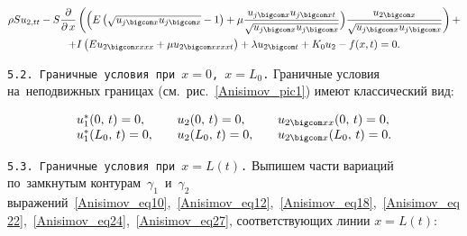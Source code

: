 \begin{multline}\label{Anisimov_eq30}

\rho Su_{2,tt}-S\frac{\partial}{\partial\,x}\left(\Bigl(E\left(\sqrt{u_{j \bigcom x}u_{j \bigcom x}}-1\right)+ \mu\frac{u_{j \bigcom x}u_{j \bigcom xt}}{\sqrt{u_{j \bigcom x}u_{j \bigcom x}}}\Bigr) \frac{u_{2 \bigcom x}}{\sqrt{u_{j \bigcom x}u_{j \bigcom x}}}\right)+\\

+I\left(Eu_{2 \bigcom xxxx}+\mu u_{2 \bigcom xxxxt}\right)+\lambda u_{2 \bigcom t}+K_0u_2-f( x,  t )=0.

\end{multline}



\smallskip



{\tt 5.2. Граничные условия при $x=0$, $x=L_0$.} Граничные условия на~неподвижных границах (см.~рис.~\ref{Anisimov_pic1}) имеют классический вид:

\begin{equation}\label{Anisimov_eq31}

\begin{array}{lll}

u_1^{*}(0,\,t)=0,\quad &u_2(0,\,t)=0,\quad &u_{2 \bigcom xx}(0,\,t)=0,\\

u_1^{*}(L_0,\,t)=0,\quad &u_2(L_0,\,t)=0,\quad &u_{2 \bigcom x}(L_0,\,t)=0.

\end{array}

\end{equation}



{\tt 5.3. Граничные условия при $x=L(t)$.} Выпишем части вариаций по~замкнутым контурам~$\gamma_1$~и~$\gamma_2$ выражений~\eqref{Anisimov_eq10},~\eqref{Anisimov_eq12},~\eqref{Anisimov_eq18},~\eqref{Anisimov_eq22},~\eqref{Anisimov_eq24},~\eqref{Anisimov_eq27}, соответствующих линии $x=L(t)$:

